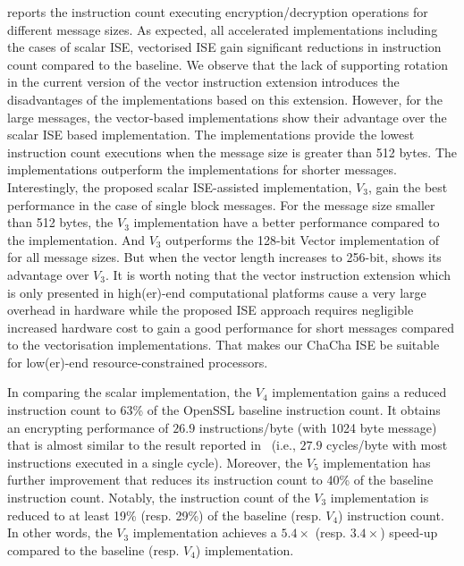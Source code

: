  reports the instruction count executing encryption/decryption operations for different message sizes. 
As expected, all accelerated implementations including the cases of scalar ISE, vectorised ISE gain significant reductions in instruction count compared to the baseline. 
We observe that the lack of supporting rotation in the current version of the vector instruction extension introduces the disadvantages of the implementations based on this extension. 
However, for the large messages, the vector-based implementations show their advantage over the scalar ISE based implementation. 
The  implementations provide the lowest instruction count executions when the message size is greater than 512 bytes. 
The  implementations outperform the  implementations for shorter messages.
Interestingly, the proposed scalar ISE-assisted implementation, $V_3$, gain the best performance in the case of single block messages.
For the message size smaller than 512 bytes, the $V_3$ implementation have a better performance compared to the  implementation. 
And $V_3$ outperforms the 128-bit Vector implementation of  for all message sizes. But when the vector length increases to 256-bit,  shows its advantage over $V_3$. It is worth noting that the vector instruction extension which is only presented in high(er)-end computational platforms cause a very large overhead in hardware while the proposed ISE approach requires negligible increased hardware cost to gain a good performance for short messages compared to the vectorisation implementations. That makes our ChaCha ISE be suitable for low(er)-end resource-constrained processors.

In comparing the scalar implementation, the $V_4$ implementation gains a reduced instruction count to 63\% of the OpenSSL baseline instruction count.
It obtains an encrypting performance of $26.9$ instructions/byte (with 1024 byte message) that is almost similar to the result reported in~\cite{Sto:19} (i.e., $27.9$ cycles/byte with most instructions executed in a single cycle). Moreover, the $V_5$ implementation has further improvement that reduces its instruction count to 40\% of the baseline instruction count.
Notably, the instruction count of the $V_3$ implementation is reduced to at least 19\% (resp. 29\%) of the baseline (resp. $V_4$) instruction count. In other words, the $V_3$ implementation achieves a $5.4\times$ (resp. $3.4\times$) speed-up compared to the baseline (resp. $V_4$) implementation.

